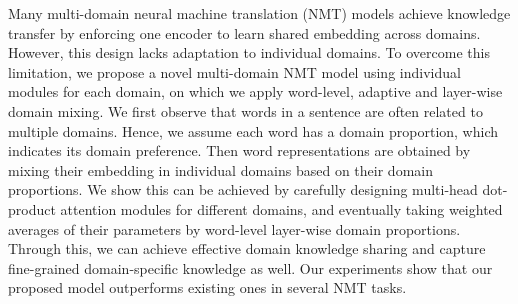 Many multi-domain neural machine translation (NMT) models achieve knowledge transfer by enforcing one encoder to learn shared embedding across domains. However, this design lacks adaptation to individual domains. To overcome this limitation, we propose a novel multi-domain NMT model using individual modules for each domain, on which we apply word-level, adaptive and layer-wise domain mixing. We first observe that words in a sentence are often related to multiple domains. Hence, we assume each word has a domain proportion, which indicates its domain preference. Then word representations are obtained by mixing their embedding in individual domains based on their domain proportions. We show this can be achieved by carefully designing multi-head dot-product attention modules for different domains, and eventually taking weighted averages of their parameters by word-level layer-wise domain proportions. Through this, we can achieve effective domain knowledge sharing and capture fine-grained domain-specific knowledge as well. Our experiments show that our proposed model outperforms existing ones in several NMT tasks.
